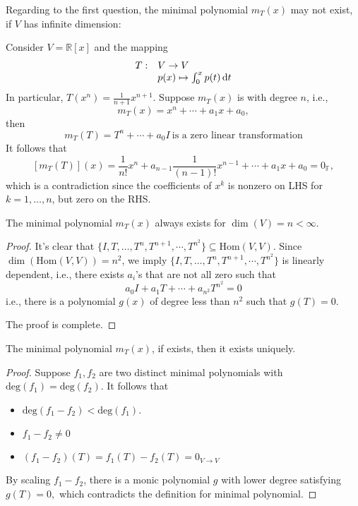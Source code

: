 Regarding to the first question, the minimal polynomial $m_T(x)$ may not exist, if $V$ has infinite dimension:
\begin{example}
Consider $V=\mathbb{R}[x]$ and the mapping
\[
\begin{array}{ll}
T:&V\to V\\
&p(x)\mapsto\int_0^xp(t)\,\mathrm{d} t
\end{array}
\]
In particular, $T(x^n)=\frac{1}{n+1}x^{n+1}$.
Suppose $m_T(x)$ is with degree $n$, i.e., 
\[
m_T(x) = x^n +\cdots+a_1x+a_0,
\]
then 
\[
m_T(T)=T^n+\cdots+a_0I\ \text{is a zero linear transformation}
\]
It follows that
\[
[m_T(T)](x) = \frac{1}{n!}x^n+a_{n-1}\frac{1}{(n-1)!}x^{n-1}+\cdots+a_1x+a_0=0_{\mathbb{F}},
\]
which is a contradiction since
the coefficients of $x^k$ is nonzero on LHS for $k=1,\dots,n$, but zero on the RHS.
\end{example}

\begin{proposition}\label{pro:7:1}
The minimal polynomial $m_T(x)$ always exists for $\dim(V)=n<\infty$.
\end{proposition}
\begin{proof}
It's clear that $\{I,T,\dots,T^n,T^{n+1},\cdots,T^{n^2}\}\subseteq\text{Hom}(V,V).$
Since $\dim(\text{Hom}(V,V))=n^2$, we imply $\{I,T,\dots,T^n,T^{n+1},\cdots,T^{n^2}\}$ is linearly dependent, i.e., there exists $a_i$'s that are not all zero such that
\[
a_0I+a_1T+\cdots+a_{n^2}T^{n^2}=0
\]
i.e., there is a polynomial $g(x)$ of degree less than $n^2$ such that $g(T)=0$.

The proof is complete.
\end{proof}

\begin{proposition}\label{pro:7:2}
The minimal polynomial $m_T(x)$, if exists, then it exists uniquely.
\end{proposition}
\begin{proof}
Suppose $f_1,f_2$ are two distinct minimal polynomials with $\text{deg}(f_1)=\text{deg}(f_2)$.
It follows that
\begin{itemize}
\item
$\text{deg}(f_1-f_2)<\text{deg}(f_1)$.
\item
$f_1-f_2\ne0$
\item
$(f_1-f_2)(T) = f_1(T) - f_2(T)=0_{V\to V}$
\end{itemize}
By scaling $f_1-f_2$, there is a monic polynomial $g$ with lower degree satisfying $g(T)=0,$
which contradicts the definition for minimal polynomial.
\end{proof}

